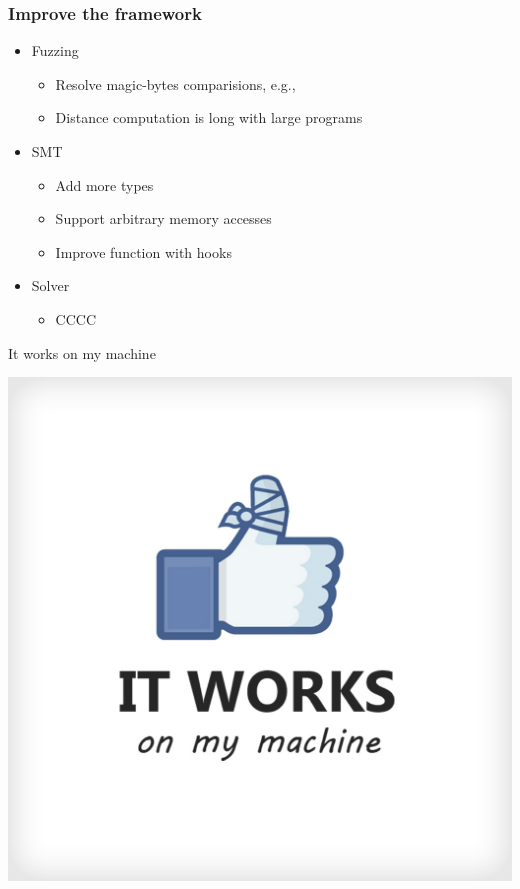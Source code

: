 \documentclass{beamer}
\begin{document}
\begin{frame}
\frametitle{Improve the framework}
\begin{itemize}
\item Fuzzing
\begin{itemize}
\item Resolve magic-bytes comparisions, e.g., 
\item Distance computation is long with large programs
\end{itemize}
\item SMT
\begin{itemize}
\item Add more types
\item Support arbitrary memory accesses
\item Improve function with hooks	
\end{itemize}
\item Solver
\begin{itemize}
\item CCCC
\end{itemize}
\end{itemize}
\end{frame}
\begin{frame}{It works on my machine}
\begin{center}
\includegraphics[height=\textheight]{Figures/Compilation}
\end{center}


\end{frame}
\end{document}
